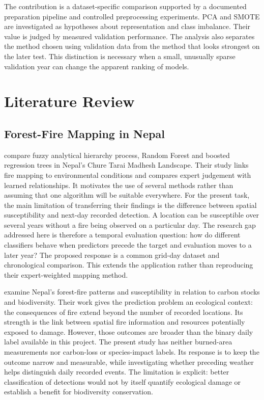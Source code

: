 \documentclass[conference,a4paper]{IEEEtran}
\begin{document}
The contribution is a dataset-specific comparison supported by a documented preparation pipeline and controlled preprocessing experiments. PCA and SMOTE are investigated as hypotheses about representation and class imbalance. Their value is judged by measured validation performance. The analysis also separates the method chosen using validation data from the method that looks strongest on the later test. This distinction is necessary when a small, unusually sparse validation year can change the apparent ranking of models.

\section{Literature Review}
\subsection{Forest-Fire Mapping in Nepal}
\citet{dhakal} compare fuzzy analytical hierarchy process, Random Forest and boosted regression trees in Nepal's Chure Tarai Madhesh Landscape. Their study links fire mapping to environmental conditions and compares expert judgement with learned relationships. It motivates the use of several methods rather than assuming that one algorithm will be suitable everywhere. For the present task, the main limitation of transferring their findings is the difference between spatial susceptibility and next-day recorded detection. A location can be susceptible over several years without a fire being observed on a particular day. The research gap addressed here is therefore a temporal evaluation question: how do different classifiers behave when predictors precede the target and evaluation moves to a later year? The proposed response is a common grid-day dataset and chronological comparison. This extends the application rather than reproducing their expert-weighted mapping method.

\citet{dahal} examine Nepal's forest-fire patterns and susceptibility in relation to carbon stocks and biodiversity. Their work gives the prediction problem an ecological context: the consequences of fire extend beyond the number of recorded locations. Its strength is the link between spatial fire information and resources potentially exposed to damage. However, those outcomes are broader than the binary daily label available in this project. The present study has neither burned-area measurements nor carbon-loss or species-impact labels. Its response is to keep the outcome narrow and measurable, while investigating whether preceding weather helps distinguish daily recorded events. The limitation is explicit: better classification of detections would not by itself quantify ecological damage or establish a benefit for biodiversity conservation.
\end{document}
